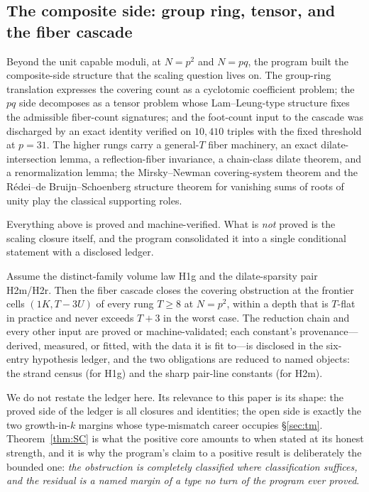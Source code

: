 \subsection{The composite side: group ring, tensor, and the fiber
cascade}

Beyond the unit capable moduli, at $N=p^2$ and $N=pq$, the program built
the composite-side structure that the scaling question lives on. The
group-ring translation expresses the covering count as a cyclotomic
coefficient problem; the $pq$ side decomposes as a tensor problem whose
Lam--Leung-type structure \cite{LamLeung} fixes the admissible
fiber-count signatures; and the foot-count input to the cascade was
discharged by an exact identity verified on $10{,}410$ triples with the
fixed threshold at $p=31$. The higher rungs carry a general-$T$ fiber
machinery, an exact dilate-intersection lemma, a reflection-fiber
invariance, a chain-class dilate theorem, and a renormalization lemma;
the Mirsky--Newman covering-system theorem and the
R\'edei--de Bruijn--Schoenberg structure theorem for vanishing sums of
roots of unity \cite{MirskyNewman,LamLeung} play the classical
supporting roles.

Everything above is proved and machine-verified. What is \emph{not}
proved is the scaling closure itself, and the program consolidated it
into a single conditional statement with a disclosed ledger.

\begin{theorem}\label{thm:SC}
Assume the distinct-family volume law H1g and the dilate-sparsity pair
H2m/H2r. Then the fiber cascade closes the covering obstruction at the
frontier cells $(1K,T{-}3U)$ of every rung $T\ge8$ at $N=p^2$, within a
depth that is $T$-flat in practice and never exceeds $T+3$ in the worst
case. The reduction chain and every other input are proved or
machine-validated; each constant's provenance---derived, measured, or
fitted, with the data it is fit to---is disclosed in the six-entry
hypothesis ledger, and the two obligations are reduced to named objects:
the strand census (for H1g) and the sharp pair-line constants (for
H2m).
\end{theorem}

We do not restate the ledger here. Its relevance to this paper is its
shape: the proved side of the ledger is all closures and identities; the
open side is exactly the two growth-in-$k$ margins whose type-mismatch
career occupies \S\ref{sec:tm}. Theorem~\ref{thm:SC} is what the positive
core amounts to when stated at its honest strength, and it is why the
program's claim to a positive result is deliberately the bounded one:
\emph{the obstruction is completely classified where classification
suffices, and the residual is a named margin of a type no turn of the
program ever proved}.
